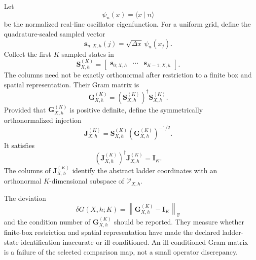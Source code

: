 Let
\begin{equation}
    \psi_n(x)=\langle x\mid n\rangle
\end{equation}
be the normalized real-line oscillator eigenfunction. For a uniform grid,
define the quadrature-scaled sampled vector
\begin{equation}
    \mathbf s_{n;X,h}(j)
    =
    \sqrt{\Delta x}\,\psi_n(x_j).
\end{equation}
Collect the first $K$ sampled states in
\begin{equation}
    \mathbf S_{X,h}^{(K)}
    =
    \begin{bmatrix}
        \mathbf s_{0;X,h}
        & \cdots &
        \mathbf s_{K-1;X,h}
    \end{bmatrix}.
\end{equation}
The columns need not be exactly orthonormal after restriction to a finite box
and spatial representation. Their Gram matrix is
\begin{equation}
    \mathbf G_{X,h}^{(K)}
    =
    \left(\mathbf S_{X,h}^{(K)}\right)^\dagger
    \mathbf S_{X,h}^{(K)}.
\end{equation}
Provided that $\mathbf G_{X,h}^{(K)}$ is positive definite, define the
symmetrically orthonormalized injection
\begin{equation}
    \mathbf J_{X,h}^{(K)}
    =
    \mathbf S_{X,h}^{(K)}
    \left(\mathbf G_{X,h}^{(K)}\right)^{-1/2}.
\end{equation}
It satisfies
\begin{equation}
    \left(\mathbf J_{X,h}^{(K)}\right)^\dagger
    \mathbf J_{X,h}^{(K)}
    =
    \mathbf I_K.
\end{equation}
The columns of $\mathbf J_{X,h}^{(K)}$ identify the abstract ladder coordinates
with an orthonormal $K$-dimensional subspace of $\mathcal V_{X,h}$.


The deviation
\begin{equation}
    \delta G(X,h;K)
    =
    \left\lVert
        \mathbf G_{X,h}^{(K)}-\mathbf I_K
    \right\rVert_{\mathrm F}
\end{equation}
and the condition number of $\mathbf G_{X,h}^{(K)}$ should be reported. They
measure whether finite-box restriction and spatial representation have made
the declared ladder-state identification inaccurate or ill-conditioned. An
ill-conditioned Gram matrix is a failure of the selected comparison map, not a
small operator discrepancy.

